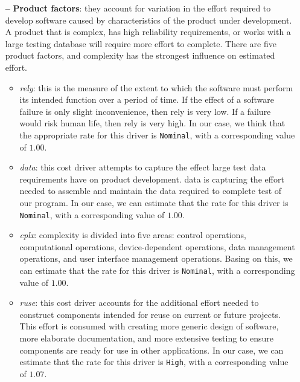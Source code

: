\begin{itemize}

\item[\textbf{--}] \textbf{Product factors}: they account for variation in the effort required to develop software caused by characteristics of the product under development. A product that is complex, has high reliability requirements, or works with a large testing database will require more effort to complete. There are five product factors, and complexity has the strongest influence on estimated effort.

\begin{itemize}
	
	\item \textit{\acl{rely}}: this is the measure of the extent to which the software must perform its intended function over a period of time. If the effect of a software failure is only slight inconvenience, then \acs{rely} is very low. If a failure would risk human life, then \acs{rely} is very high. In our case, we think that the appropriate rate for this driver is \texttt{Nominal}, with a corresponding value of $1.00$.
	
	\item \textit{\acl{data}}: this cost driver attempts to capture the effect large test data requirements have on product development. \acs{data} is capturing the effort needed to assemble and maintain the data required to complete test of our program. In our case, we can estimate that the rate for this driver is \texttt{Nominal}, with a corresponding value of $1.00$.
	
	\item \textit{\acl{cplx}}: complexity is divided into five areas: control operations, computational operations, device-dependent operations, data management operations, and user interface management operations.  Basing on this, we can estimate that the rate for this driver is \texttt{Nominal}, with a corresponding value of $1.00$.
	
	\item \textit{\acl{ruse}}: this cost driver accounts for the additional effort needed to construct components intended for reuse on current or future projects. This effort is consumed with creating more generic design of software, more elaborate documentation, and more extensive testing to ensure components are ready for use in other applications. In our case, we can estimate that the rate for this driver is \texttt{High}, with a corresponding value of $1.07$.
	

\end{itemize}
\end{itemize}
